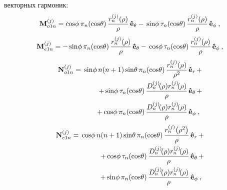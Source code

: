 векторных гармоник:
\begin{equation}
  \label{eq:2p1mod}
 \begin{alignedat}{2}
  {\rm\mathbf{M}}_{o1n}^{(j)} ={\rm cos} \phi\,
         \pi_n\!\left({\rm  cos} \theta\right)
         \frac{r_n^{(j)}\!\left( \rho \right)}{\rho}\,
         {\boldsymbol{\hat{\rm e}}}_{\theta}   
-\,{\rm sin} \phi\,
         \tau_n\!\left({\rm  cos} \theta\right)
         \frac{r_n^{(j)}\!\left( \rho \right)}{\rho}\,
         &{\boldsymbol{\hat{\rm e}}}_{\phi}\:,
 \end{alignedat}
\end{equation}
%
\begin{equation}
 \begin{alignedat}{2}
  {\rm\mathbf{M}}_{e1n}^{(j)} =-\,{\rm sin} \phi\,
         \pi_n\!\left({\rm  cos} \theta\right)
         \frac{r_n^{(j)}\!\left( \rho \right)}{\rho}\,
         {\boldsymbol{\hat{\rm e}}}_{\theta}   
-\, {\rm cos} \phi\,
         \tau_n\!\left({\rm  cos} \theta\right)
         \frac{r_n^{(j)}\!\left( \rho \right)}{\rho}\,
         &{\boldsymbol{\hat{\rm e}}}_{\phi}\:,
 \end{alignedat}
\end{equation}
%
\begin{equation}
 \begin{alignedat}{2}
{\rm \mathbf{N}}_{o1n}^{(j)} = \,{\rm sin} \phi\,n\!\left(n+1\right)
         {\rm sin}\theta\,
         \pi_n\!\left({\rm  cos} \theta\right)
         \frac{
           r_n^{(j)}\!\left( \rho \right)
              }{\rho^2}\,
           &{\boldsymbol{\hat{\rm e}}}_{r}\,+   \\
+\,
{\rm sin} \phi\,
         \tau_n\!\left({\rm  cos} \theta\right)
         \frac{
           D_n^{(j)}\!(\rho) r_n^{(j)}\!(\rho)
              }{\rho}\,
            &{\boldsymbol{\hat{\rm e}}}_{\theta}\,+   \\
+\,
{\rm cos} \phi\,
         \pi_n\!\left({\rm  cos} \theta\right)
         \frac{
           D_n^{(j)}\!(\rho) r_n^{(j)}\!(\rho)
              }{\rho}\,
            &{\boldsymbol{\hat{\rm e}}}_{\phi}\:,
\end{alignedat}
\end{equation}
%
\begin{equation}
 \begin{alignedat}{2}
{\rm \mathbf{N}}_{e1n}^{(j)} = \,{\rm cos} \phi\,n\!\left(n+1\right)
         {\rm sin}\theta\,
         \pi_n\!\left({\rm  cos} \theta\right)
         \frac{
               r_n^{(j)}\!\left( \rho^2 \right)
              }{\rho}\,
           &{\boldsymbol{\hat{\rm e}}}_{r}\,+   \\
+\,
{\rm cos} \phi\,
         \tau_n\!\left({\rm  cos} \theta\right)
         \frac{
           D_n^{(j)}\!(\rho) r_n^{(j)}\!(\rho)
              }{\rho}\,
            &{\boldsymbol{\hat{\rm e}}}_{\theta}\,+   \\
+\,
{\rm sin} \phi\,
         \pi_n\!\left({\rm  cos} \theta\right)
         \frac{
           D_n^{(j)}\!(\rho) r_n^{(j)}\!(\rho)
              }{\rho}\,
            &{\boldsymbol{\hat{\rm e}}}_{\phi}\:,
\end{alignedat}
\end{equation}

